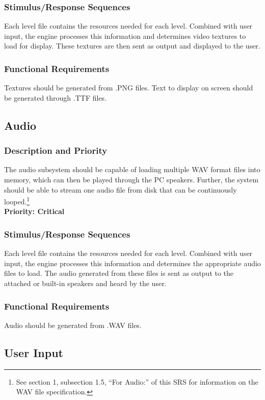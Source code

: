 \documentclass{article}
\begin{document}
		\subsubsection{Stimulus/Response Sequences}
			Each level file contains the resources needed for each level. Combined with user input, the engine processes this information and determines video textures to load for display. These textures are then sent as output and displayed to the user. 
		\subsubsection{Functional Requirements}
			Textures should be generated from .PNG files. Text to display on screen should be generated through .TTF files.
	\subsection{Audio}
		\subsubsection{Description and Priority}
			The audio subsystem should be capable of loading multiple WAV format files into memory, which can then be played through the PC speakers. Further, the system should be able to stream one audio file from disk that can be continuously looped.\footnote{See section 1, subsection 1.5, ``For Audio:'' of this SRS for information on the WAV file specification.}\bigskip \\
			\textbf{Priority: Critical}
		\subsubsection{Stimulus/Response Sequences}
			Each level file contains the resources needed for each level. Combined with user input, the engine processes this information and determines the appropriate audio files to load. The audio generated from these files is sent as output to the attached or built-in speakers and heard by the user.
		\subsubsection{Functional Requirements}
			Audio should be generated from .WAV files. 
	\subsection{User Input}
\end{document}
